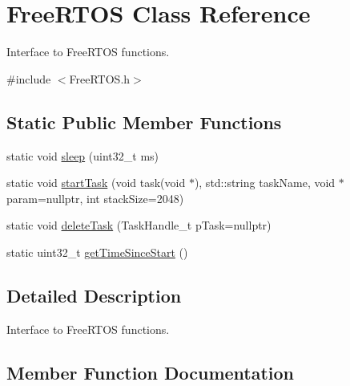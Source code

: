 \hypertarget{class_free_r_t_o_s}{}\section{Free\+R\+T\+OS Class Reference}
\label{class_free_r_t_o_s}


Interface to Free\+R\+T\+OS functions.  




{\ttfamily \#include $<$Free\+R\+T\+O\+S.\+h$>$}

\subsection*{Static Public Member Functions}
\begin{DoxyCompactItemize}
\item 
static void \hyperlink{class_free_r_t_o_s_abea19fd141147c054f47c6a00e77f2ff}{sleep} (uint32\+\_\+t ms)
\item 
static void \hyperlink{class_free_r_t_o_s_ae2540d35409fe97ce0c95c3b4a3dd9e6}{start\+Task} (void task(void $\ast$), std\+::string task\+Name, void $\ast$param=nullptr, int stack\+Size=2048)
\item 
static void \hyperlink{class_free_r_t_o_s_a965b07cf1ca57fd0eb61df092b98edab}{delete\+Task} (Task\+Handle\+\_\+t p\+Task=nullptr)
\item 
static uint32\+\_\+t \hyperlink{class_free_r_t_o_s_aa2f4b1bd2944ae5e0c97a5dcbca65e66}{get\+Time\+Since\+Start} ()
\end{DoxyCompactItemize}


\subsection{Detailed Description}
Interface to Free\+R\+T\+OS functions. 

\subsection{Member Function Documentation}
